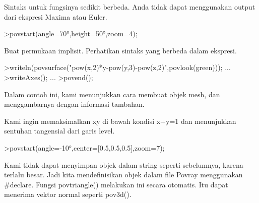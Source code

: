 \documentclass[a4paper,10pt]{article}
\begin{document}
\begin{eulernotebook}
\begin{eulercomment}
\begin{eulercomment}
\begin{eulercomment}
\begin{eulercomment}
\begin{eulercomment}
\begin{eulercomment}
\begin{eulercomment}
\begin{eulercomment}
\begin{eulercomment}
\begin{eulercomment}
\begin{eulercomment}
Sintaks untuk fungsinya sedikit berbeda. Anda tidak dapat menggunakan
output dari ekspresi Maxima atau Euler.
\end{eulercomment}
\begin{eulerprompt}
>povstart(angle=70°,height=50°,zoom=4);
\end{eulerprompt}
\begin{eulercomment}
Buat permukaan implisit. Perhatikan sintaks yang berbeda dalam
ekspresi.
\end{eulercomment}
\begin{eulerprompt}
>writeln(povsurface("pow(x,2)*y-pow(y,3)-pow(z,2)",povlook(green))); ...
>writeAxes(); ...
>povend();
\end{eulerprompt}
\begin{eulercomment}
Dalam contoh ini, kami menunjukkan cara membuat objek mesh, dan
menggambarnya dengan informasi tambahan.

Kami ingin memaksimalkan xy di bawah kondisi x+y=1 dan menunjukkan
sentuhan tangensial dari garis level.
\end{eulercomment}
\begin{eulerprompt}
>povstart(angle=-10°,center=[0.5,0.5,0.5],zoom=7);
\end{eulerprompt}
\begin{eulercomment}
Kami tidak dapat menyimpan objek dalam string seperti sebelumnya,
karena terlalu besar. Jadi kita mendefinisikan objek dalam file Povray
menggunakan #declare. Fungsi povtriangle() melakukan ini secara
otomatis. Itu dapat menerima vektor normal seperti pov3d().


\end{eulercomment}
\end{eulercomment}
\end{eulercomment}
\end{eulercomment}
\end{eulercomment}
\end{eulercomment}
\end{eulercomment}
\end{eulercomment}
\end{eulercomment}
\end{eulercomment}
\end{eulercomment}
\end{eulernotebook}
\end{document}
